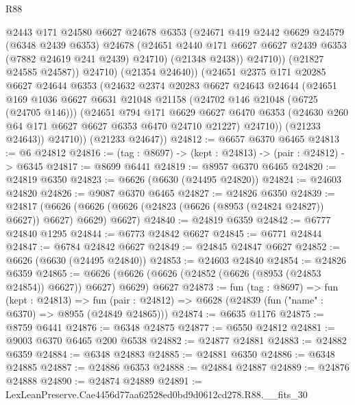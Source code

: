 \begin{lexlean}{R88}
\begin{coremodule}
                  @2443
                  @171
                  @24580
                  @6627
                  @24678
                  @6353
                  (@24671
                    @419
                    @2442
                    @6629
                    @24579
                    (@6348 @2439 @6353)
                    @24678
                    (@24651 @2440 @171 @6627 @6627 @2439 @6353 (@7882 @24619 @241 @2439) @24710)
                    (@21348 @2438))
                  @24710))
              (@21827 @24585 @24587))
            @24710)
          (@21354 @24640))
        (@24651
          @2375
          @171
          @20285
          @6627
          @24644
          @6353
          (@24632
            @2374
            @20283
            @6627
            @24643
            @24644
            (@24651
              @169
              @1036
              @6627
              @6631
              @21048
              @21158
              (@24702 @146 @21048 (@6725 (@24705 @146)))
              (@24651
                @794
                @171
                @6629
                @6627
                @6470
                @6353
                (@24630 @260 @64 @171 @6627 @6627 @6353 @6470 @24710 @21227)
                @24710))
            (@21233 @24643))
          @24710))
      (@21233 @24647))
@24812 := @6657 @6370 @6465
@24813 := @6 @24812
@24816 := (tag : @8697) -> (kept : @24813) -> (pair : @24812) -> @6345
@24817 := @8699 @6441
@24819 := @8957 @6370 @6465
@24820 := @24819 @6350
@24823 := @6626 (@6630 (@24495 @24820))
@24824 := @24603 @24820
@24826 := @9087 @6370 @6465
@24827 := @24826 @6350
@24839 := @24817
    (@6626 (@6626 (@6626 (@24823 (@6626 (@8953 (@24824 @24827)) @6627)) @6627) @6629) @6627)
@24840 := @24819 @6359
@24842 := @6777 @24840 @1295
@24844 := @6773 @24842 @6627
@24845 := @6771 @24844
@24847 := @6784 @24842 @6627
@24849 := @24845 @24847 @6627
@24852 := @6626 (@6630 (@24495 @24840))
@24853 := @24603 @24840
@24854 := @24826 @6359
@24865 := @6626 (@6626 (@6626 (@24852 (@6626 (@8953 (@24853 @24854)) @6627)) @6627) @6629) @6627
@24873 := fun (tag : @8697) =>
  fun (kept : @24813) =>
  fun (pair : @24812) => @6628 (@24839 (fun ("name" : @6370) => @8955 (@24849 @24865)))
@24874 := @6635 @1176
@24875 := @8759 @6441
@24876 := @6348 @24875
@24877 := @6550 @24812
@24881 := @9003 @6370 @6465 @200 @6538
@24882 := @24877 @24881
@24883 := @24882 @6359
@24884 := @6348 @24883
@24885 := @24881 @6350
@24886 := @6348 @24885
@24887 := @24886 @6353
@24888 := @24884 @24887
@24889 := @24876 @24888
@24890 := @24874 @24889
@24891 := LexLeanPreserve.Cae4456d77aa62528ed0bd9d0612cd278.R88.__fits_30

\end{coremodule}
\end{lexlean}
